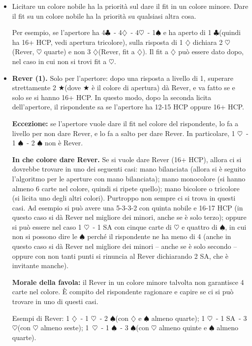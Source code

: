 \documentclass[a4paper,10pt]{article}
\renewcommand{\c}{$\clubsuit$\xspace}
\renewcommand{\d}{$\diamondsuit$\xspace}
\newcommand{\h}{$\heartsuit$\xspace}
\newcommand{\s}{$\spadesuit$\xspace}
\renewcommand{\j}{$\bigstar$\xspace}
\newcommand{\sa}{SA\xspace}
\begin{document}
\begin{itemize}
 \item Licitare un colore nobile ha la priorità sul dare il fit in un colore minore. Dare il fit su un colore nobile ha la priorità su qualsiasi altra cosa.
 
 Per esempio, se l'apertore ha 4\c\ - 4\d\ - 4\h\ - 1\s e ha aperto di 1 \c (quindi ha 16+ HCP, vedi apertura tricolore), sulla risposta di 1 \d dichiara 2 \h (Rever, \h quarte) e non 3 \d (Rever, fit a \d).
 Il fit a \d può essere dato dopo, nel caso in cui non si trovi fit a \h.
 
 \item {\bf Rever (1).} Solo per l'apertore: dopo una risposta a livello di 1, superare strettamente 2 \j (dove \j è il colore di apertura) dà Rever, e va fatto se e solo se si hanno 16+ HCP.
 In questo modo, dopo la seconda licita dell'apertore, il rispondente sa se l'apertore ha 12-15 HCP oppure 16+ HCP.
 
 {\bf Eccezione:} se l'apertore vuole dare il fit nel colore del rispondente, lo fa a livello per non dare Rever, e lo fa a salto per dare Rever. In particolare, 1 \h\ - 1 \s\ - 2 \s non è Rever.
 
 {\bf In che colore dare Rever.} Se si vuole dare Rever (16+ HCP), allora ci si dovrebbe trovare in uno dei seguenti casi: mano bilanciata (allora si è seguito l'algoritmo per le aperture con mano bilanciata); mano monocolore (si hanno almeno 6 carte nel colore, quindi si ripete quello); mano bicolore o tricolore (si licita uno degli altri colori). Purtroppo non sempre ci si trova in questi casi.
 Ad esempio si può avere una 5-3-3-2 con quinta nobile e 16-17 HCP (in questo caso si dà Rever nel migliore dei minori, anche se è solo terzo);
 oppure si può essere nel caso 1 \h\ - 1 \sa con cinque carte di \h e quattro di \s, in cui non si possono dire le \s perché il rispondente ne ha meno di 4 (anche in questo caso si dà Rever nel migliore dei minori -- anche se è solo secondo -- oppure con non tanti punti si rinuncia al Rever dichiarando 2 \sa, che è invitante manche).
 
 {\bf Morale della favola:} il Rever in un colore minore talvolta non garantisce 4 carte nel colore. È compito del rispondente ragionare e capire se ci si può trovare in uno di questi casi.
 
 Esempi di Rever: 1 \d\ - 1 \h\ - 2 \s (con \d e \s almeno quarte); 1 \h\ - 1 \sa\ - 3 \h (con \h almeno seste); \hbox{1 \h}\ - 1 \s\ - 3 \s (con \h almeno quinte e \s almeno quarte).
 

\end{itemize}
\end{document}
